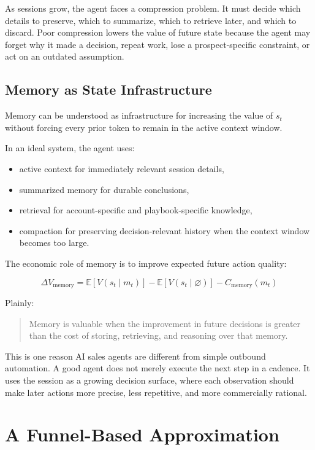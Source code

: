 \documentclass[12pt]{article}
\begin{document}
As sessions grow, the agent faces a compression problem. It must decide which
details to preserve, which to summarize, which to retrieve later, and which to
discard. Poor compression lowers the value of future state because the agent may
forget why it made a decision, repeat work, lose a prospect-specific constraint,
or act on an outdated assumption.

\subsection{Memory as State Infrastructure}

Memory can be understood as infrastructure for increasing the value of \(s_t\)
without forcing every prior token to remain in the active context window.

In an ideal system, the agent uses:

\begin{itemize}
    \item active context for immediately relevant session details,
    \item summarized memory for durable conclusions,
    \item retrieval for account-specific and playbook-specific knowledge,
    \item compaction for preserving decision-relevant history when the context
    window becomes too large.
\end{itemize}

The economic role of memory is to improve expected future action quality:

\[
\Delta V_{\text{memory}}
=
\mathbb{E}[V(s_t \mid m_t)]
-
\mathbb{E}[V(s_t \mid \varnothing)]
-
C_{\text{memory}}(m_t)
\]

Plainly:

\begin{quote}
    Memory is valuable when the improvement in future decisions is greater than
    the cost of storing, retrieving, and reasoning over that memory.
\end{quote}

This is one reason AI sales agents are different from simple outbound
automation. A good agent does not merely execute the next step in a cadence. It
uses the session as a growing decision surface, where each observation should
make later actions more precise, less repetitive, and more commercially
rational.

\section{A Funnel-Based Approximation}
\end{document}

